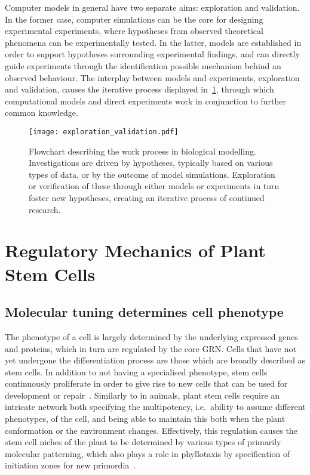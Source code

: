 Computer models in general have two separate aims: exploration and validation.
In the former case, computer simulations can be the core for designing
experimental experiments, where hypotheses from observed theoretical phenomena
can be experimentally tested. In the latter, models are established in order to
support hypotheses surrounding experimental findings, and can directly guide
experiments through the identification possible mechanism behind an observed
behaviour. The interplay between models and experiments, exploration and
validation, causes the iterative process displayed in~\cref{fig:expl_val},
through which computational models and direct experiments work in conjunction to further
common knowledge.
\begin{figure}[H]
  \centering
  \texttt{[image: exploration\_validation.pdf]}
  \caption[Modelling biological systems: an illustration]{Flowchart describing
    the work process in biological modelling. Investigations are driven by
    hypotheses, typically based on various types of data, or by the outcome of
    model simulations. Exploration or verification of these through either
    models or experiments in turn foster new hypotheses, creating an iterative
    process of continued research.}  
  \label{fig:expl_val}
\end{figure}

\section{Regulatory Mechanics of Plant Stem Cells} %
\subsection{Molecular tuning determines cell phenotype} %
The phenotype of a cell is largely determined by the underlying
expressed genes and proteins, which in turn are regulated by the core GRN. Cells
that have not yet undergone the differentiation process are those which are
broadly described as stem cells. In addition to not having a specialised phenotype,
stem cells continuously proliferate in order to give rise to new cells that can
be used for development or repair~\cite{clark2001cell}.
Similarly to in animals, plant stem cells require an intricate network both
specifying the multipotency, i.e.\ ability to assume different phenotypes, of
the cell, and being able to maintain this both when the plant  
conformation or the environment changes. Effectively, this regulation causes the
stem cell niches of the plant to be determined by various types of primarily
molecular patterning, which also plays a role in phyllotaxis by specification of
initiation zones for new primordia~\cite{reinhardt2003regulation}.

